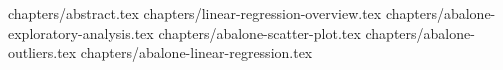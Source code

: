\documentclass[a4paper,12pt]{article}
\begin{document}
 
 
 

\tableofcontents
\clearpage
{chapters/abstract.tex}
{chapters/linear-regression-overview.tex}
{chapters/abalone-exploratory-analysis.tex}
{chapters/abalone-scatter-plot.tex}
{chapters/abalone-outliers.tex}
{chapters/abalone-linear-regression.tex}
 


\end{document}
